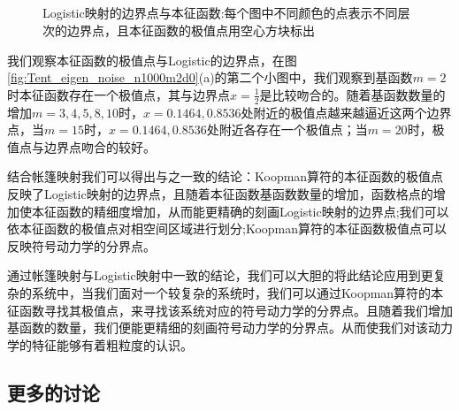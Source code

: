 \begin{figure}[!]
    \centering%
      \\
      \\
      \\
      \\
    \caption[Logistic映射的边界点与本征函数]{Logistic映射的边界点与本征函数:每个图中不同颜色的点表示不同层次的边界点，且本征函数的极值点用空心方块标出}\label{fig:Logistic_eigen_noise_n1000m2d0}
  \end{figure}

  我们观察本征函数的极值点与Logistic的边界点，在图\ref{fig:Tent_eigen_noise_n1000m2d0}(a)的第二个小图中，我们观察到基函数$m=2$时本征函数存在一个极值点，其与边界点$x=\frac{1}{2}$是比较吻合的。随着基函数数量的增加$m=3,4,5,8,10$时，$x=0.1464,0.8536$处附近的极值点越来越逼近这两个边界点，当$m=15$时，$x=0.1464,0.8536$处附近各存在一个极值点；当$m=20$时，极值点与边界点吻合的较好。

  结合帐篷映射我们可以得出与之一致的结论：Koopman算符的本征函数的极值点反映了Logistic映射的边界点，且随着本征函数基函数数量的增加，函数格点的增加使本征函数的精细度增加，从而能更精确的刻画Logistic映射的边界点;我们可以依本征函数的极值点对相空间区域进行划分;Koopman算符的本征函数极值点可以反映符号动力学的分界点。
  
  通过帐篷映射与Logistic映射中一致的结论，我们可以大胆的将此结论应用到更复杂的系统中，当我们面对一个较复杂的系统时，我们可以通过Koopman算符的本征函数寻找其极值点，来寻找该系统对应的符号动力学的分界点。且随着我们增加基函数的数量，我们便能更精细的刻画符号动力学的分界点。从而使我们对该动力学的特征能够有着粗粒度的认识。

\subsection{更多的讨论}

